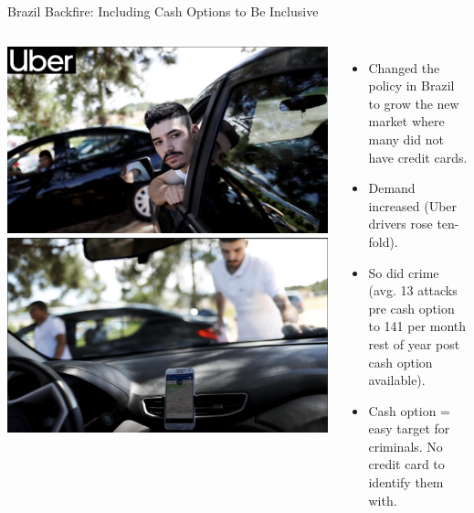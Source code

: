 \documentclass[nobackground,dvipsnames,table,aspectratio=169]{beamer}
\begin{document}
\begin{frame}{Brazil Backfire: Including Cash Options to Be Inclusive}
    \begin{columns}
            \includegraphics[width=\textwidth]{brazil-uber-1}
            \includegraphics[width=\textwidth]{brazil-uber-2}
            \begin{itemize}
                \item Changed the policy in Brazil to grow the new market where many did not have credit cards.
                \item Demand increased (Uber drivers rose ten-fold).
                \item So did crime (avg. 13 attacks pre cash option to 141 per month rest of year post cash option available).
                \item Cash option = easy target for criminals. No credit card to identify them with.
            \end{itemize}
    \end{columns}
\end{frame}
\end{document}
